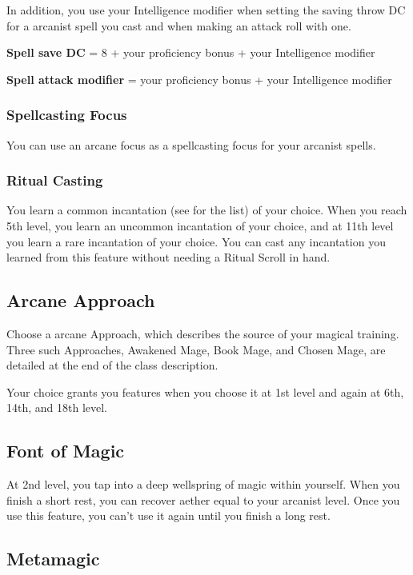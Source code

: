 In addition, you use your Intelligence modifier when setting the saving throw DC for a arcanist spell you cast and when making an attack roll with one.

\textbf{Spell save DC} = 8 + your proficiency bonus + your Intelligence modifier

\textbf{Spell attack modifier} = your proficiency bonus + your Intelligence modifier

\subsubsection{Spellcasting Focus}

You can use an arcane focus as a spellcasting focus for your arcanist spells.

\subsubsection{Ritual Casting}

You learn a common incantation (see  for the list) of your choice. When you reach 5th level, you learn an uncommon incantation of your choice, and at 11th level you learn a rare incantation of your choice. You can cast any incantation you learned from this feature without needing a Ritual Scroll in hand.

\subsection{Arcane Approach}

Choose a arcane Approach, which describes the source of your magical training. Three such Approaches, Awakened Mage, Book Mage, and Chosen Mage, are detailed at the end of the class description.

Your choice grants you features when you choose it at 1st level and again at 6th, 14th, and 18th level.

\subsection{Font of Magic}

At 2nd level, you tap into a deep wellspring of magic within yourself. When you finish a short rest, you can recover aether equal to your arcanist level. Once you use this feature, you can't use it again until you finish a long rest.

\subsection{Metamagic}

